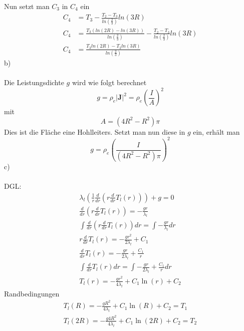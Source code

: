 Nun setzt man $C_3$ in $C_4$ ein
\begin{align*}
	C_4 &= T_3 -  \frac{T_2 - T_3}{ln\left( \frac{2}{3}\right)} ln\left( 3R\right) \\
	C_4 &= \frac{T_3 \left( ln\left( 2R\right) - ln\left( 3R\right) \right)}{ln\left( \frac{2}{3}\right)} - \frac{T_2 - T_3}{ln\left( \frac{2}{3}\right)} ln\left( 3R\right) \\
	C_4 &= \frac{T_3 ln\left( 2R \right) - T_2 ln\left( 3R\right)}{ln\left( \frac{2}{3}\right)}
\end{align*}
b) \\ \\	
Die Leistungsdichte $g$ wird wie folgt berechnet
\[
	g = \rho_e |\textbf{J}|^2 = \rho_e \left( \frac{I}{A}\right)^2
\]
mit
\[
	A = \left(4R^2 - R^2\right)\pi
\]
Dies ist die Fläche eine Hohlleiters. Setzt man nun diese in $g$ ein, erhält man
\[
	g = \rho_e \left( \frac{I}{\left(4R^2 - R^2\right)\pi}\right)^2
\]
c) \\ \\
DGL:
\begin{align*}
	\lambda_l \left( \frac{1}{r}\frac{d}{dr}\left( r\frac{d}{dr} T_l\left(r\right)\right)\right) + g = 0 \\
	\frac{d}{dr}\left( r\frac{d}{dr} T_l\left(r\right)\right) = -\frac{gr}{\lambda_l} \\
	\int \frac{d}{dr}\left( r\frac{d}{dr} T_l\left(r\right)\right) dr = \int -\frac{gr}{\lambda_l} dr \\
	 r\frac{d}{dr} T_l\left(r\right) = -\frac{gr^2}{2\lambda_l} + C_1 \\
	 \frac{d}{dr} T_l\left(r\right) = -\frac{gr}{2\lambda_l} + \frac{C_1}{r} \\
	 \int \frac{d}{dr} T_l\left(r\right) dr = \int -\frac{gr}{2\lambda_l} + \frac{C_1}{r} dr \\
	 T_l\left(r\right) = -\frac{gr^2}{4\lambda_l} + C_1\ln\left( r \right) + C_2
\end{align*}
Randbedingungen
\begin{align*}
	T_l\left(R\right) = -\frac{gR^2}{4\lambda_l} + C_1\ln\left(R\right) + C_2 = T_1 \\
	T_l\left(2R\right) = -\frac{g4R^2}{4\lambda_l} + C_1 \ln\left(2R\right) + C_2 = T_2
\end{align*}